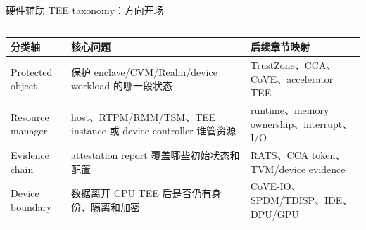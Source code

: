 \begin{frame}[t,shrink=6]{硬件辅助 TEE taxonomy：方向开场}
\begin{columns}[T,totalwidth=\textwidth]
\begin{column}{0.49\textwidth}
{\begin{minipage}[t]{0.97\linewidth}
\begin{minipage}{0.92\linewidth}
      \scriptsize {\tiny
\begin{tabularx}{\linewidth}{@{}YYY@{}}
\toprule
\textbf{分类轴} & \textbf{核心问题} & \textbf{后续章节映射} \\
\midrule
Protected object & 保护 enclave/CVM/Realm/device workload 的哪一段状态 & TrustZone、CCA、CoVE、accelerator TEE \\
Resource manager & host、RTPM/RMM/TSM、TEE instance 或 device controller 谁管资源 & runtime、memory ownership、interrupt、I/O \\
Evidence chain & attestation report 覆盖哪些初始状态和配置 & RATS、CCA token、TVM/device evidence \\
Device boundary & 数据离开 CPU TEE 后是否仍有身份、隔离和加密 & CoVE-IO、SPDM/TDISP、IDE、DPU/GPU \\
\bottomrule
\end{tabularx}
}
    \end{minipage}
    \vspace{1mm}
  \end{minipage}}
  \end{column}
\end{columns}
\end{frame}


